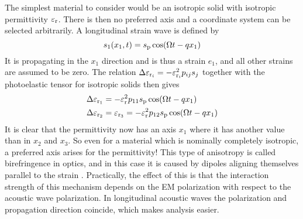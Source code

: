 \documentclass[11pt,twoside]{eitExjobb}
\begin{document}
	The simplest material to consider would be an isotropic solid with isotropic permittivity $\varepsilon_{\mathrm{r}}$. There is then no preferred axis and a coordinate system can be selected arbitrarily. A longitudinal strain wave is defined by \begin{equation*}
		s_1(x_1,t) = s_{\mathrm{p}} \cos(\Omega t - qx_1)
	\end{equation*}
	It is propagating in the $x_1$ direction and is thus a strain $e_1$, and all other strains are assumed to be zero. The relation $\Delta \varepsilon_{\mathrm{r}_i} = -\varepsilon_{\mathrm{r}_i}^2 p_{ij} s_j$ together with the photoelastic tensor for isotropic solids then gives
	\begin{align*}
		\Delta \varepsilon_{\mathrm{r}_1} &= -\varepsilon_{\mathrm{r}}^2 p_{11} s_{\mathrm{p}} \cos(\Omega t - qx_1)\\
		\Delta \varepsilon_{\mathrm{r}_2} &= \varepsilon_{\mathrm{r}_3} = -\varepsilon_{\mathrm{r}}^2 p_{12} s_{\mathrm{p}} \cos(\Omega t - qx_1)
	\end{align*}
	It is clear that the permittivity now has an axis $x_1$ where it has another value than in $x_2$ and $x_3$. So even for a material which is nominally completely isotropic, a preferred axis arises for the permittivity! This type of anisotropy is called birefringence in optics, and in this case it is caused by dipoles aligning themselves parallel to the strain \cite{Korpel1988}. Practically, the effect of this is that the interaction strength of this mechanism depends on the EM polarization with respect to the acoustic wave polarization. In longitudinal acoustic waves the polarization and propagation direction coincide, which makes analysis easier.
	
\end{document}
